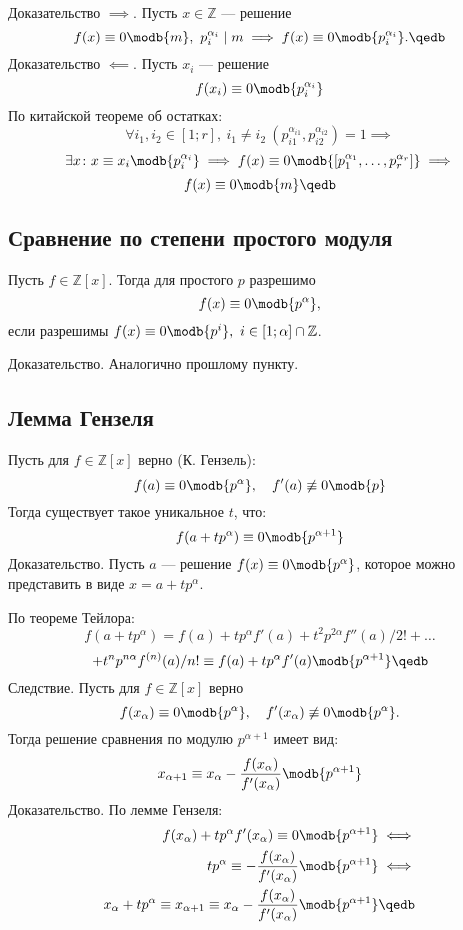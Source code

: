 {\bold Доказательство $\implies$.} Пусть $x\in\mathbb{Z}$ --- решение
$$f(x)\equiv 0\modb{m},\ p_i^{\alpha_i}\mid m\implies f(x)\equiv 0\modb{p_i^{\alpha_i}}.\qedb$$
{\bold Доказательство $\impliedby$.} Пусть $x_i$ --- решение
$$f(x_i)\equiv 0\modb{p_i^{\alpha_i}}$$
По китайской теореме об остатках:
$$\forall i_1,i_2\in[1;r],\ i_1\neq i_2\ (p_{i1}^{\alpha_{i1}},p_{i2}^{\alpha_{i2}})=1\implies$$
$$\exists x\colon x\equiv x_i\modb{p_i^{\alpha_i}}\implies f(x)\equiv 0\modb{[p_1^{\alpha_1},\dots,p_r^{\alpha_r}]}\implies$$
$$f(x)\equiv 0\modb{m}\qedb$$ 

\subsection{Сравнение по степени простого модуля}

Пусть $f\in\mathbb{Z}[x]$. Тогда для простого $p$ разрешимо
$$f(x)\equiv 0\modb{p^\alpha},$$
если разрешимы $f(x)\equiv 0\modb{p^i},\ i\in[1;\alpha]\cap\mathbb{Z}$.

{\bold Доказательство.} Аналогично прошлому пункту.

\subsection{Лемма Гензеля}

Пусть для $f\in\mathbb{Z}[x]$ верно {\ital\color{desc}(К. Гензель)}:
$$f(a)\equiv 0\modb{p^\alpha},\quad f'(a)\not\equiv 0\modb{p}$$
Тогда существует такое уникальное $t$, что:
$$f(a+tp^\alpha)\equiv 0\modb{p^{\alpha+1}}$$
{\bold Доказательство.} Пусть $a$ --- решение $f(x)\equiv 0\modb{p^\alpha}$, которое можно представить в виде $x=a+tp^\alpha$.

По теореме Тейлора:
$$f(a+tp^\alpha)=f(a)+tp^\alpha f'(a)+t^2p^{2\alpha}f''(a)/2!+\dots$$
$$+t^np^{n\alpha}f^{(n)}(a)/n!\equiv f(a)+tp^\alpha f'(a)\modb{p^{\alpha+1}}\qedb$$
{\bold Следствие.} Пусть для $f\in\mathbb{Z}[x]$ верно
$$f(x_\alpha)\equiv 0\modb{p^\alpha},\quad f'(x_\alpha)\not\equiv 0\modb{p^\alpha}.$$
Тогда решение сравнения по модулю $p^{\alpha+1}$ имеет вид:
$$x_{\alpha+1}\equiv x_\alpha-\frac{f(x_\alpha)}{f'(x_\alpha)}\modb{p^{\alpha+1}}$$
{\bold Доказательство.} По лемме Гензеля:
\begin{align*}
f(x_\alpha)+tp^\alpha f'(x_\alpha)\equiv 0&\modb{p^{\alpha+1}}\iff\\
tp^\alpha\equiv-\frac{f(x_\alpha)}{f'(x_\alpha)}&\modb{p^{\alpha+1}}\iff\\
x_\alpha+tp^\alpha\equiv x_{\alpha+1}\equiv x_\alpha-\frac{f(x_\alpha)}{f'(x_\alpha)}&\modb{p^{\alpha+1}}\qedb
\end{align*}
